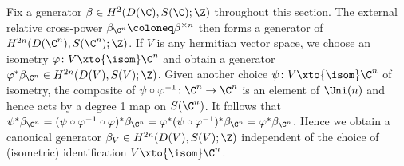 Fix a generator $\beta \in H^2(D(\C), S(\C); \Z)$ throughout this section.
The external relative cross-power $\beta_{\C^n} \coloneq \beta^{\times n}$ then forms a generator of $H^{2n}(D(\C^n), S(\C^n); \Z)$.
If $V$ is any hermitian vector space, we choose an isometry $\varphi\colon V \xto{\isom} \C^n$ and obtain a generator $\varphi^* \beta_{\C^n} \in H^{2n}(D(V), S(V); \Z)$.
Given another choice $\psi\colon V \xto{\isom} \C^n$ of isometry, the composite of $\psi \circ \varphi^{-1}\colon \C^n \to \C^n$ is an element of $\Uni(n)$ and hence acts by a degree 1 map on $S(\C^n)$.
It follows that $\psi^* \beta_{\C^n} = (\psi \circ \varphi^{-1} \circ \varphi)^* \beta_{\C^n} = \varphi^* (\psi \circ \varphi^{-1})^* \beta_{\C^n} = \varphi^* \beta_{\C^n}$.
Hence we obtain a canonical generator $\beta_V \in H^{2n}(D(V), S(V); \Z)$ independent of the choice of (isometric) identification $V \xto{\isom} \C^n$.

